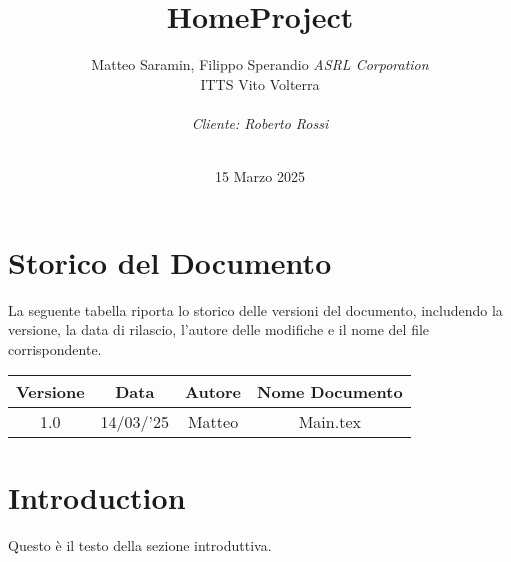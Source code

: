 \documentclass[italian, 12pt, a4paper]{article}
\title{HomeProject}
\author{Matteo Saramin, Filippo Sperandio \textit{ASRL Corporation} \\ {\small ITTS Vito Volterra} \\ \\ \emph{Cliente: Roberto Rossi}}
\date{\version\\ 15 Marzo 2025}
\begin{document}
\maketitle                                           %
\section{Storico del Documento}
La seguente tabella riporta lo storico delle versioni del documento, includendo la versione, la data di rilascio, l'autore delle modifiche e il nome del file corrispondente.
\begin{center}
    \renewcommand{\arraystretch}{1.5} %
    \begin{tabular}{|c|c|c|c|}
        \hline
        \rowcolor{gray !30}
        \hspace{5mm} Versione \hspace{5mm} & 
        \hspace{5mm} Data \hspace{5mm} & 
        \hspace{5mm} Autore \hspace{5mm} & 
        \hspace{5mm} Nome Documento \hspace{5mm} \\
        \hline
        1.0 & 14/03/'25 & Matteo & Main.tex \\
        \hline
    \end{tabular}
\end{center}    

\section{Introduction}
Questo è il testo della sezione introduttiva.
\end{document}
